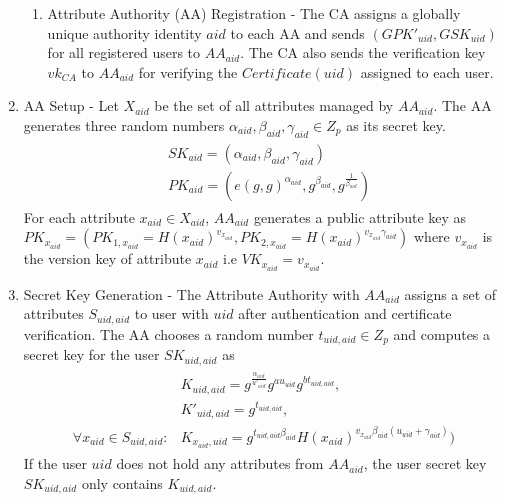 \begin{enumerate}
\begin{enumerate}
		\item Attribute Authority (AA) Registration - The CA assigns a globally unique authority identity $ aid $ to each AA and sends $ (GPK'_{uid}, GSK_{uid}) $ for all registered users to $ AA_{aid} $. The CA also sends the verification key $ vk_{CA} $ to $ AA_{aid} $ for verifying the $ Certificate(uid) $ assigned to each user.
		
	\end{enumerate}
	
	\item AA Setup - Let $ X_{aid} $ be the set of all attributes managed by $ AA_{aid} $. The AA generates three random numbers $ \alpha_{aid}, \beta_{aid}, \gamma_{aid} \in Z_{p} $ as its secret key.
	\begin{align}
	\begin{split}
	&SK_{aid} = (\alpha_{aid}, \beta_{aid}, \gamma_{aid}) \\
	&PK_{aid} = (e(g, g)^{\alpha_{aid}}, g^{\beta_{aid}}, g^{\frac{1}{\beta_{aid}}})
	\end{split}
	\end{align}
	For each attribute $ x_{aid} \in X_{aid} $, $ AA_{aid} $ generates a public attribute key as $ PK_{x_{aid}} = (PK_{1, x_{aid}} = H(x_{aid})^{v_{x_{aid}}}, PK_{2, x_{aid}} = H(x_{aid})^{v_{x_{aid}}\gamma_{aid}}) $ where $ v_{x_{aid}} $ is the version key of attribute $ x_{aid} $ i.e $ VK_{x_{aid}} = v_{x_{aid}} $.
	
	\item Secret Key Generation - The Attribute Authority with $ AA_{aid} $ assigns a set of attributes $ S_{uid,aid} $ to user with $ uid $ after authentication and certificate verification. The AA chooses a random number $ t_{uid,aid} \in Z_{p} $ and computes a secret key for the user $SK_{uid,aid}$ as
	\begin{align}
	\begin{split}
	&K_{uid,aid} = g^{\frac{\alpha_{aid}}{u'_{uid}}}g^{au_{uid}}g^{bt_{uid,aid}},\\ &K'_{uid,aid} = g^{t_{uid,aid}}, \\
	\forall x_{aid} \in S_{uid,aid} \colon &K_{x_{aid},uid} = g^{t_{uid,aid}\beta_{aid}}H(x_{aid})^{v_{x_{aid}}\beta_{aid}(u_{uid} + \gamma_{aid})})
	\end{split}
	\end{align}
	If the user $ uid $ does not hold any attributes from $ AA_{aid} $, the user secret key $ SK_{uid,aid} $ only contains $ K_{uid,aid} $.
	

\end{enumerate}
